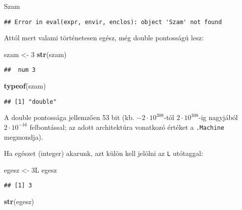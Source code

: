 \documentclass[]{book}
\newenvironment{Shaded}{\begin{snugshade}}{\end{snugshade}}
\newcommand{\KeywordTok}[1]{\textcolor[rgb]{0.13,0.29,0.53}{\textbf{#1}}}
\newcommand{\DecValTok}[1]{\textcolor[rgb]{0.00,0.00,0.81}{#1}}
\newcommand{\StringTok}[1]{\textcolor[rgb]{0.31,0.60,0.02}{#1}}
\newcommand{\NormalTok}[1]{#1}
\begin{document}
\begin{Shaded}
\begin{Highlighting}[]
\NormalTok{Szam}
\end{Highlighting}
\end{Shaded}

\begin{verbatim}
## Error in eval(expr, envir, enclos): object 'Szam' not found
\end{verbatim}

Attól mert valami történetesen egész, még double pontosságú lesz:

\begin{Shaded}
\begin{Highlighting}[]
\NormalTok{szam <-}\StringTok{ }\DecValTok{3}
\KeywordTok{str}\NormalTok{(szam)}
\end{Highlighting}
\end{Shaded}

\begin{verbatim}
##  num 3
\end{verbatim}

\begin{Shaded}
\begin{Highlighting}[]
\KeywordTok{typeof}\NormalTok{(szam)}
\end{Highlighting}
\end{Shaded}

\begin{verbatim}
## [1] "double"
\end{verbatim}

A double pontossága jellemzően 53 bit (kb. \(-2\cdot 10^{308}\)-tól
\(2\cdot 10^{308}\)-ig nagyjából \(2\cdot 10^{-16}\) felbontással; az
adott architektúra vonatkozó értéket a \texttt{.Machine} megmondja).

Ha egészet (integer) akarunk, azt külön kell jelölni az \texttt{L}
utótaggal:

\begin{Shaded}
\begin{Highlighting}[]
\NormalTok{egesz <-}\StringTok{ }\NormalTok{3L}
\NormalTok{egesz}
\end{Highlighting}
\end{Shaded}

\begin{verbatim}
## [1] 3
\end{verbatim}

\begin{Shaded}
\begin{Highlighting}[]
\KeywordTok{str}\NormalTok{(egesz)}
\end{Highlighting}
\end{Shaded}
\end{document}
